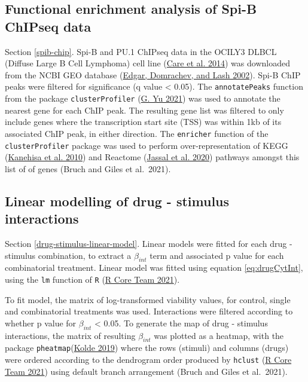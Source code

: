\documentclass[11pt, a4paper, twosided]{book}
\begin{document}
\hypertarget{functional-enrichment-analysis-of-spi-b-chipseq-data}{%
\subsection{Functional enrichment analysis of Spi-B ChIPseq data}\label{functional-enrichment-analysis-of-spi-b-chipseq-data}}

Section \ref{spib-chip}. Spi-B and PU.1 ChIPseq data in the OCILY3 DLBCL (Diffuse Large B Cell Lymphoma) cell line (\protect\hyperlink{ref-Care2014}{Care et al. 2014}) was downloaded from the NCBI GEO database (\protect\hyperlink{ref-Edgar2002}{Edgar, Domrachev, and Lash 2002}). Spi-B ChIP peaks were filtered for significance (q value \textless{} 0.05). The \texttt{annotatePeaks} function from the package \texttt{clusterProfiler} (\protect\hyperlink{ref-R-clusterProfiler}{G. Yu 2021}) was used to annotate the nearest gene for each ChIP peak. The resulting gene list was filtered to only include genes where the transcription start site (TSS) was within 1kb of its associated ChIP peak, in either direction. The \texttt{enricher} function of the \texttt{clusterProfiler} package was used to perform over-representation of KEGG (\protect\hyperlink{ref-KEGG}{Kanehisa et al. 2010}) and Reactome (\protect\hyperlink{ref-Reactome}{Jassal et al. 2020}) pathways amongst this list of of genes (Bruch and Giles et al.~2021).

\hypertarget{drug-stimulus-linear-model-method}{%
\subsection{Linear modelling of drug - stimulus interactions}\label{drug-stimulus-linear-model-method}}

Section \ref{drug-stimulus-linear-model}. Linear models were fitted for each drug - stimulus combination, to extract a \(\beta_{int}\) term and associated p value for each combinatorial treatment. Linear model was fitted using equation \eqref{eq:drugCytInt}, using the \texttt{lm} function of \texttt{R} (\protect\hyperlink{ref-R-base}{R Core Team 2021}).

To fit model, the matrix of log-transformed viability values, for control, single and combinatorial treatments was used. Interactions were filtered according to whether p value for \(\beta_{int}\) \textless{} 0.05. To generate the map of drug - stimulus interactions, the matrix of resulting \(\beta_{int}\) was plotted as a heatmap, with the package \texttt{pheatmap}(\protect\hyperlink{ref-R-pheatmap}{Kolde 2019}) where the rows (stimuli) and columns (drugs) were ordered according to the dendrogram order produced by \texttt{hclust} (\protect\hyperlink{ref-R-base}{R Core Team 2021}) using default branch arrangement (Bruch and Giles et al.~2021).
\end{document}
